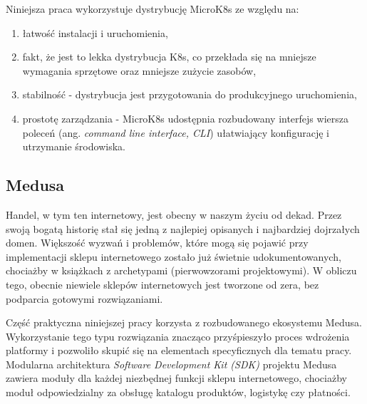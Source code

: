 Niniejsza praca wykorzystuje dystrybucję MicroK8s\cite{microk8s-docs-home} ze względu na:
\begin{enumerate}
    \item łatwość instalacji i uruchomienia,
    \item fakt, że jest to lekka dystrybucja K8s, co przekłada się na mniejsze wymagania sprzętowe oraz mniejsze zużycie zasobów,
    \item stabilność - dystrybucja jest przygotowania do produkcyjnego uruchomienia,
    \item prostotę zarządzania - MicroK8s udostępnia rozbudowany interfejs wiersza poleceń (ang. \emph{command line interface, CLI}) ułatwiający konfigurację i utrzymanie środowiska.
\end{enumerate}

\subsection{Medusa}\label{subsec:medusa}

Handel, w tym ten internetowy, jest obecny w naszym życiu od dekad.
Przez swoją bogatą historię stał się jedną z najlepiej opisanych i najbardziej dojrzałych domen.
Większość wyzwań i problemów, które mogą się pojawić przy implementacji sklepu internetowego zostało już świetnie udokumentowanych, chociażby w książkach z archetypami (pierwowzorami projektowymi).
W obliczu tego, obecnie niewiele sklepów internetowych jest tworzone od zera, bez podparcia gotowymi rozwiązaniami.

Część praktyczna niniejszej pracy korzysta z rozbudowanego ekosystemu Medusa\cite{medusajs-homepage}.
Wykorzystanie tego typu rozwiązania znacząco przyśpieszyło proces wdrożenia platformy i pozwoliło skupić się na elementach specyficznych dla tematu pracy.
Modularna architektura \emph{Software Development Kit (SDK)} projektu Medusa zawiera moduły dla każdej niezbędnej funkcji sklepu internetowego, chociażby moduł odpowiedzialny za obsługę katalogu produktów, logistykę czy płatności.
